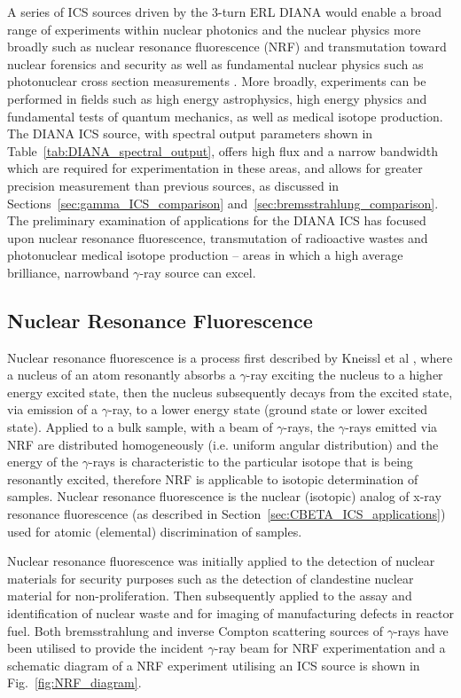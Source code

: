 \documentclass[../main.tex]{subfiles}
\begin{document}
A series of ICS sources driven by the 3-turn ERL DIANA would enable a broad range of experiments within nuclear photonics \cite{nedorezov2017nuclear,budker2021expanding} and the nuclear physics more broadly such as nuclear resonance fluorescence (NRF) and transmutation toward nuclear forensics and security as well as fundamental nuclear physics such as photonuclear cross section measurements \cite{renstrom2018verification}.
More broadly, experiments can be performed in fields such as high energy astrophysics, high energy physics and fundamental tests of quantum mechanics, as well as medical isotope production. The DIANA ICS source, with spectral output parameters shown in Table~\ref{tab:DIANA_spectral_output}, offers high flux and a narrow bandwidth which are required for experimentation in these areas, and allows for greater precision measurement than previous sources, as discussed in Sections~\ref{sec:gamma_ICS_comparison} and~\ref{sec:bremsstrahlung_comparison}. The preliminary examination of applications for the DIANA ICS has focused upon nuclear resonance fluorescence, transmutation of radioactive wastes and photonuclear medical isotope production -- areas in which a high average brilliance, narrowband $\gamma$-ray source can excel.  

\subsection{Nuclear Resonance Fluorescence}

Nuclear resonance fluorescence is a process first described by Kneissl et al \cite{kneissl1996investigation}, where a nucleus of an atom resonantly absorbs a $\gamma$-ray exciting the nucleus to a higher energy excited state, then the nucleus subsequently decays from the excited state, via emission of a $\gamma$-ray, to a lower energy state (ground state or lower excited state). Applied to a bulk sample, with a beam of $\gamma$-rays, the $\gamma$-rays emitted via NRF are distributed homogeneously (i.e. uniform angular distribution) and the energy of the $\gamma$-rays is characteristic to the particular isotope that is being resonantly excited, therefore NRF is applicable to isotopic determination of samples. Nuclear resonance fluorescence is the nuclear (isotopic) analog of x-ray resonance fluorescence (as described in Section~\ref{sec:CBETA_ICS_applications}) used for atomic (elemental) discrimination of samples.  

Nuclear resonance fluorescence was initially applied to the detection of nuclear materials for security purposes such as the detection of clandestine nuclear material \cite{bertozzi2005nuclear,pruet2006detecting,geddes2017impact} for non-proliferation. Then subsequently applied to the assay and identification of nuclear waste \cite{hayakawa2010nondestructive,angell2015demonstration,bolind2015states} and for imaging of manufacturing defects in reactor fuel. Both bremsstrahlung and inverse Compton scattering sources of $\gamma$-rays have been utilised to provide the incident $\gamma$-ray beam for NRF experimentation and a schematic diagram of a NRF experiment utilising an ICS source is shown in Fig.~\ref{fig:NRF_diagram}.
\end{document}
